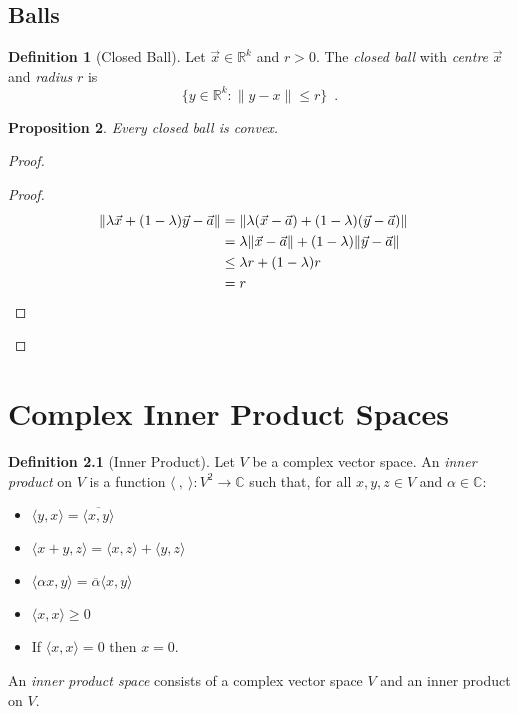 \documentclass{book}
\let\qed\relax
\newtheorem{prop}{Proposition}[chapter]
\theoremstyle{definition}
\newtheorem{df}[prop]{Definition}
\begin{document}
\section{Balls}

\begin{df}[Closed Ball]
Let $\vec{x} \in \mathbb{R}^k$ and $r > 0$. The \emph{closed ball} with \emph{centre} $\vec{x}$ and \emph{radius} $r$ is
\[ \{ y \in \mathbb{R}^k : \| y - x \| \leq r \} \enspace . \]
\end{df}

\begin{prop}
Every closed ball is convex.
\end{prop}

\begin{proof}
\pf
{}
\begin{proof}
\pf
\begin{align*}
\| \lambda \vec{x} + (1 - \lambda) \vec{y} - \vec{a} \|
& = \| \lambda (\vec{x} - \vec{a}) + (1 - \lambda) (\vec{y} - \vec{a}) \| \\
& = \lambda \| \vec{x} - \vec{a} \| + (1 - \lambda) \| \vec{y} - \vec{a} \| \\
& \leq \lambda r + (1 - \lambda) r \\
& = r & \qed
\end{align*}
\end{proof}
\qed
\end{proof}

\chapter{Complex Inner Product Spaces}

\newcommand{\ket}[1]{\ensuremath{\left| {#1} \right\rangle}}
\newcommand{\bra}[1]{\ensuremath{\left\langle {#1} \right|}}

\begin{df}[Inner Product]
Let $V$ be a complex vector space. An \emph{inner product} on $V$ is a function $\langle \ , \ \rangle :  V^2 \rightarrow \mathbb{C}$ such that, for all $x,y,z \in V$ and $\alpha \in \mathbb{C}$:
\begin{itemize}
\item $\langle y,x \rangle = \overline{\langle x,y \rangle}$
\item $\langle x+y,z \rangle = \langle x,z \rangle + \langle y,z \rangle$
\item $\langle \alpha x,y \rangle = \overline{\alpha} \langle x,y \rangle$
\item $\langle x,x \rangle \geq 0$
\item If $\langle x,x \rangle = 0$ then $x = 0$.
\end{itemize}
An \emph{inner product space} consists of a complex vector space $V$ and an inner product on $V$.
\end{df}
\end{document}
